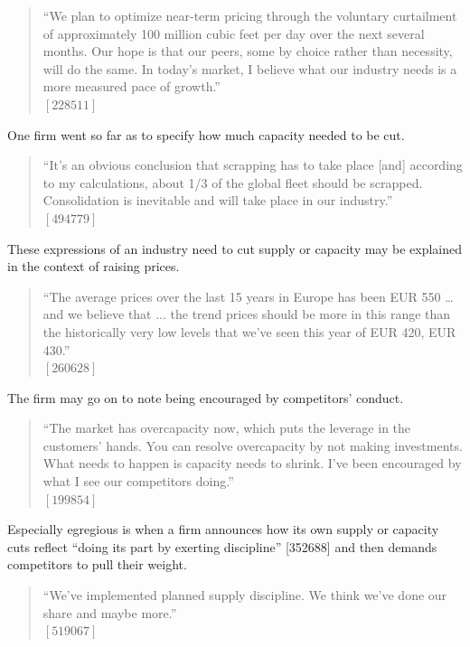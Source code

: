 \begin{quote}
``We plan to optimize near-term pricing through the voluntary curtailment of approximately 100 million cubic feet per day over the next several months. Our hope is that our peers, some by choice rather than necessity, will do the same. In today's market, I believe what our industry needs is a more measured pace of growth.'' \\
$[228511]$
\end{quote}

One firm went so far as to specify how much capacity needed to be cut.

\begin{quote}
``It's an obvious conclusion that scrapping has to take place [and] according to my calculations, about 1/3 of the global fleet should be scrapped. Consolidation is inevitable and will take place in our industry.'' \\
$[494779]$
\end{quote}

These expressions of an industry need to cut supply or capacity may be explained in the context of raising prices.

\begin{quote}
``The average prices over the last 15 years in Europe has been EUR 550 … and we believe that ... the trend prices should be more in this range than the historically very low levels that we've seen this year of EUR 420, EUR 430.'' \\
$[260628]$
\end{quote}

The firm may go on to note being encouraged by competitors’ conduct.

\begin{quote}
``The market has overcapacity now, which puts the leverage in the customers' hands. You can resolve overcapacity by not making investments. What needs to happen is capacity needs to shrink. I've been encouraged by what I see our competitors doing.'' \\
$[199854]$
\end{quote}

Especially egregious is when a firm announces how its own supply or capacity cuts reflect ``doing its part by exerting discipline'' [352688] and then demands competitors to pull their weight.

\begin{quote}
``We've implemented planned supply discipline. We think we've done our share and maybe more.'' \\
$[519067]$
\end{quote}

